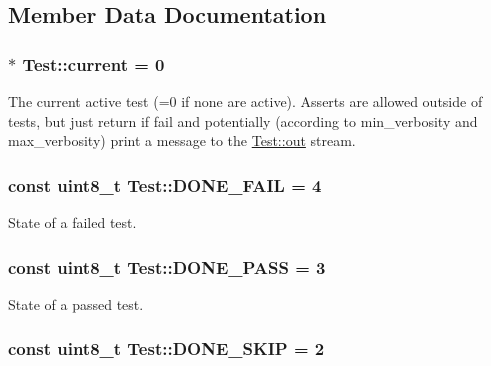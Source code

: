 \subsection{Member Data Documentation}
\hypertarget{class_test_ab33c60d07c2338204a0bafe40f995177}{
\subsubsection[{current}]{ $\ast$ Test\-::current = 0\hspace{0.3cm}{\ttfamily [static]}}}\label{class_test_ab33c60d07c2338204a0bafe40f995177}
The current active test (=0 if none are active). Asserts are allowed outside of tests, but just return if fail and potentially (according to min\-\_\-verbosity and max\-\_\-verbosity) print a message to the \hyperlink{class_test_a33e59751992ec1a8a65745c0b6b144b0}{Test\-::out} stream. \hypertarget{class_test_a4ad0055670d3ae4babadc094002c17fd}{
\subsubsection[{D\-O\-N\-E\-\_\-\-F\-A\-I\-L}]{\setlength{\rightskip}{0pt plus 5cm}const uint8\-\_\-t Test\-::\-D\-O\-N\-E\-\_\-\-F\-A\-I\-L = 4\hspace{0.3cm}{\ttfamily [static]}}}\label{class_test_a4ad0055670d3ae4babadc094002c17fd}
State of a failed test. \hypertarget{class_test_ab1a131191af040400d33ea8f8b2c25af}{
\subsubsection[{D\-O\-N\-E\-\_\-\-P\-A\-S\-S}]{\setlength{\rightskip}{0pt plus 5cm}const uint8\-\_\-t Test\-::\-D\-O\-N\-E\-\_\-\-P\-A\-S\-S = 3\hspace{0.3cm}{\ttfamily [static]}}}\label{class_test_ab1a131191af040400d33ea8f8b2c25af}
State of a passed test. \hypertarget{class_test_af7ee7b197c214e110e13537bc0b277e2}{
\subsubsection[{D\-O\-N\-E\-\_\-\-S\-K\-I\-P}]{\setlength{\rightskip}{0pt plus 5cm}const uint8\-\_\-t Test\-::\-D\-O\-N\-E\-\_\-\-S\-K\-I\-P = 2\hspace{0.3cm}{\ttfamily [static]}}}\label{class_test_af7ee7b197c214e110e13537bc0b277e2}
